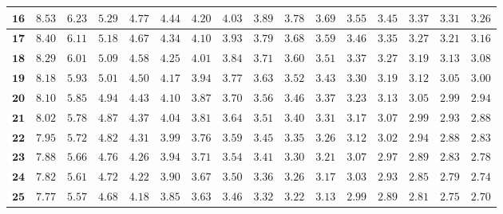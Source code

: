 \begin{customTableWrapper}{1.4}
\begin{longtable}{|r|r|r|r|r|r|r|r|r|r|r|r|r|r|r|r|}
    ${\mathbf{16}}$  & ${8.53}$   & ${6.23}$   & ${5.29}$   & ${4.77}$   & ${4.44}$   & ${4.20}$   & ${4.03}$   & ${3.89}$   & ${3.78}$   & ${3.69}$   & ${3.55}$   & ${3.45}$   & ${3.37}$   & ${3.31}$   & ${3.26}$   \\ \hline 
    ${\mathbf{17}}$  & ${8.40}$   & ${6.11}$   & ${5.18}$   & ${4.67}$   & ${4.34}$   & ${4.10}$   & ${3.93}$   & ${3.79}$   & ${3.68}$   & ${3.59}$   & ${3.46}$   & ${3.35}$   & ${3.27}$   & ${3.21}$   & ${3.16}$   \\ \hline 
    ${\mathbf{18}}$  & ${8.29}$   & ${6.01}$   & ${5.09}$   & ${4.58}$   & ${4.25}$   & ${4.01}$   & ${3.84}$   & ${3.71}$   & ${3.60}$   & ${3.51}$   & ${3.37}$   & ${3.27}$   & ${3.19}$   & ${3.13}$   & ${3.08}$   \\ \hline 
    ${\mathbf{19}}$  & ${8.18}$   & ${5.93}$   & ${5.01}$   & ${4.50}$   & ${4.17}$   & ${3.94}$   & ${3.77}$   & ${3.63}$   & ${3.52}$   & ${3.43}$   & ${3.30}$   & ${3.19}$   & ${3.12}$   & ${3.05}$   & ${3.00}$   \\ \hline 
    ${\mathbf{20}}$  & ${8.10}$   & ${5.85}$   & ${4.94}$   & ${4.43}$   & ${4.10}$   & ${3.87}$   & ${3.70}$   & ${3.56}$   & ${3.46}$   & ${3.37}$   & ${3.23}$   & ${3.13}$   & ${3.05}$   & ${2.99}$   & ${2.94}$   \\ \hline 
    ${\mathbf{21}}$  & ${8.02}$   & ${5.78}$   & ${4.87}$   & ${4.37}$   & ${4.04}$   & ${3.81}$   & ${3.64}$   & ${3.51}$   & ${3.40}$   & ${3.31}$   & ${3.17}$   & ${3.07}$   & ${2.99}$   & ${2.93}$   & ${2.88}$   \\ \hline 
    ${\mathbf{22}}$  & ${7.95}$   & ${5.72}$   & ${4.82}$   & ${4.31}$   & ${3.99}$   & ${3.76}$   & ${3.59}$   & ${3.45}$   & ${3.35}$   & ${3.26}$   & ${3.12}$   & ${3.02}$   & ${2.94}$   & ${2.88}$   & ${2.83}$   \\ \hline 
    ${\mathbf{23}}$  & ${7.88}$   & ${5.66}$   & ${4.76}$   & ${4.26}$   & ${3.94}$   & ${3.71}$   & ${3.54}$   & ${3.41}$   & ${3.30}$   & ${3.21}$   & ${3.07}$   & ${2.97}$   & ${2.89}$   & ${2.83}$   & ${2.78}$   \\ \hline 
    ${\mathbf{24}}$  & ${7.82}$   & ${5.61}$   & ${4.72}$   & ${4.22}$   & ${3.90}$   & ${3.67}$   & ${3.50}$   & ${3.36}$   & ${3.26}$   & ${3.17}$   & ${3.03}$   & ${2.93}$   & ${2.85}$   & ${2.79}$   & ${2.74}$   \\ \hline 
    ${\mathbf{25}}$  & ${7.77}$   & ${5.57}$   & ${4.68}$   & ${4.18}$   & ${3.85}$   & ${3.63}$   & ${3.46}$   & ${3.32}$   & ${3.22}$   & ${3.13}$   & ${2.99}$   & ${2.89}$   & ${2.81}$   & ${2.75}$   & ${2.70}$   \\ \hline 

\end{longtable}
\end{customTableWrapper}
